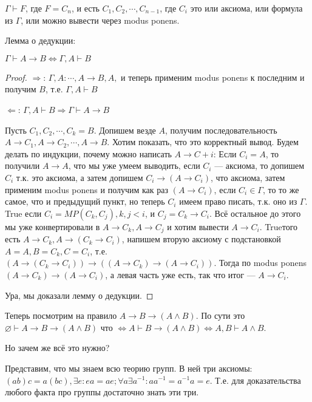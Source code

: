 \begin{definition}
	$\Gamma \vdash F$, где $F = C_n$, и есть $C_1, C_2, \cdots, C_{n-1}$,  где $C_i$ это или аксиома, или формула из $\Gamma$, или можно вывести через modus ponens.  
\end{definition}
\begin{lemma}
	Лемма о дедукции:

	$\Gamma \vdash A \to B \Leftrightarrow \Gamma, A \vdash B$
\end{lemma}
\begin{proof}
	
	$\Rightarrow$: $\Gamma, A : \cdots, A \to B, A, $ и теперь применим modus ponens к последним и получим $B$, т.е. $\Gamma, A \vdash B$

	$\Leftarrow$: $\Gamma, A \vdash B \Rightarrow \Gamma \vdash A \to B$

	Пусть $C_1, C_2, \cdots, C_k = B$. Допишем везде $A$, получим последовательность $A \to C_1, A \to C_2, \cdots, A \to B$. Хотим показать, что это корректный вывод. Будем делать по индукции, почему можно написать $A \to C+i$: Если $C_i = A$, то получили $A \to A$, что мы уже умеем выводить, если $C_i$ --- аксиома, то допишем $C_i$ т.к. это аксиома, а затем допишем $C_i \to (A \to C_i)$, что аксиома, затем применим modus ponens и получим как раз $(A \to C_i)$, если $C_i \in \Gamma$, то то же самое, что и предыдущий пункт, но теперь $C_i$ имеем право писать, т.к. оно из $\Gamma$. True если $C_i = MP(C_k, C_j), k, j < i$, и $C_j = C_k \to C_i$. Всё остальное до этого мы уже конвертировали в $A \to C_k, A \to C_j$ и хотим вывести $A \to C_i$. Trueтого есть $A \to C_k, A \to (C_k \to C_i)$, напишем вторую аксиому с подстановкой $A = A, B = C_k, C = C_i$, т.е. $(A \to (C_k \to C_i)) \to ((A \to C_k) \to (A \to C_i))$. Тогда по modus ponens $(A \to C_k) \to (A \to C_i)$, а левая часть уже есть, так что итог --- $A \to C_i$.

	Ура, мы доказали лемму о дедукции.
\end{proof}

Теперь посмотрим на правило $A \to B \to (A \land B)$. По сути это $\varnothing \vdash A \to B \to (A \land B)$ что $\Leftrightarrow A \vdash B \to (A \land B) \Leftrightarrow A, B \vdash A \land B$.

Но зачем же всё это нужно?

Представим, что мы знаем всю теорию групп. В ней три аксиомы: $(ab)c = a(bc), \exists e : ea = ae; \forall a \exists a^{-1}: a a^{-1} = a^{-1} a = e$. Т.е. для доказательства любого факта про группы достаточно знать эти три. 

